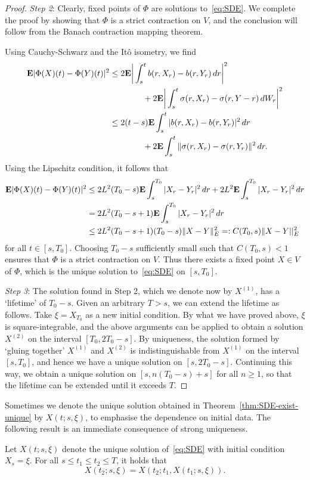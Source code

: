 \begin{proof}
	\emph{Step 2}: Clearly, fixed points of $\Phi$ are solutions to~\eqref{eq:SDE}. We complete the proof by showing that $\Phi$ is a strict contraction on $V$, and the conclusion will follow from the Banach contraction mapping theorem.
	
	Using Cauchy-Schwarz and the It\^{o} isometry, we find
	\begin{align*}
		\mathbf{E}|\Phi(X)(t)-\Phi(Y)(t)|^2 &\le 2\mathbf{E}\bigg|\int_s^t b(r,X_r)-b(r,Y_r)\,dr\bigg|^2 \\
		&\qquad\qquad + 2\mathbf{E}\bigg|\int_s^t \sigma(r,X_r)-\sigma(r,Y-r)\,dW_r\bigg|^2 \\
		&\le 2(t-s)\mathbf{E}\int_s^t|b(r,X_r)-b(r,Y_r)|^2\,dr \\
		&\qquad\qquad + 2\mathbf{E}\int_s^t \|\sigma(r,X_r)-\sigma(r,Y_r)\|^2\,dr.
	\end{align*}
	Using the Lipschitz condition, it follows that
	\begin{align*}
		\mathbf{E}|\Phi(X)(t)-\Phi(Y)(t)|^2 &\le 2L^2(T_0-s)\mathbf{E}\int_s^{T_0}|X_r-Y_r|^2\,dr + 2L^2\mathbf{E}\int_s^{T_0}|X_r-Y_r|^2\,dr \\
		&= 2L^2(T_0-s+1)\mathbf{E}\int_s^{T_0}|X_r-Y_r|^2\,dr \\
		&\le 2L^2(T_0-s+1)(T_0-s)\|X-Y\|^2_E =:C(T_0,s)\|X-Y||^2_E
	\end{align*}
	for all $t\in [s,T_0]$. Choosing $T_0-s$ sufficiently small such that $C(T_0,s)<1$ ensures that $\Phi$ is a strict contraction on $V$. Thus there exists a fixed point $X\in V$ of $\Phi$, which is the unique solution to~\eqref{eq:SDE} on $[s,T_0]$.
	
	\emph{Step 3}: The solution found in Step 2, which we denote now by $X^{(1)}$, has a `lifetime' of $T_0-s$. Given an arbitrary $T>s$, we can extend the lifetime as follows. Take $\xi=X_{T_0}$ as a new initial condition. By what we have proved above, $\xi$ is square-integrable, and the above arguments can be applied to obtain a solution $X^{(2)}$ on the interval $[T_0,2T_0-s]$. By uniqueness, the solution formed by `gluing together' $X^{(1)}$ and $X^{(2)}$ is indistinguishable from $X^{(1)}$ on the interval $[s,T_0]$, and hence we have a unique solution on $[s,2T_0-s]$. Continuing this way, we obtain a unique solution on $[s,n(T_0-s)+s]$ for all $n\ge 1$, so that the lifetime can be extended until it exceeds $T$.
\end{proof}

Sometimes we denote the unique solution obtained in Theorem~\ref{thm:SDE-exist-unique} by $X(t;s,\xi)$, to emphasise the dependence on initial data. The following result is an immediate consequence of strong uniqueness.
\begin{corollary}
	Let $X(t;s,\xi)$ denote the unique solution of~\eqref{eq:SDE} with initial condition $X_s=\xi$. For all $s\le t_1\le t_2\le T$, it holds that
	\begin{equation*}
		X(t_2;s,\xi) = X(t_2;t_1,X(t_1;s,\xi)).
	\end{equation*}
\end{corollary}

